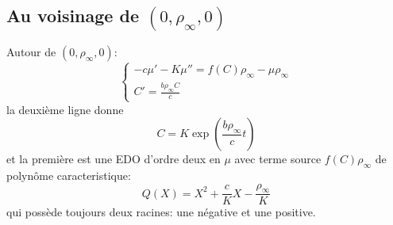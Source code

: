 \subsection{Au voisinage de $(0,\rho_\infty,0)$} 
Autour de $(0,\rho_\infty,0)$:
\begin{equation} \left\{ \begin{array}{ll} -c \mu'-K\mu''=f(C)\rho_\infty-\mu\rho_\infty\\C'=\frac{b\rho_\infty C}{c} \end{array}\right.
\end{equation}
la deuxième ligne donne \begin{equation}
C = K\exp(\frac{b\rho_\infty}{c}t )
\end{equation}
et la première est une EDO d'ordre deux  en $\mu$ avec terme source $f(C)\rho_\infty$ de polynôme caracteristique: \begin{equation}
	Q(X)=X^2+\frac{c}{K}X-\frac{\rho_\infty}{K}
\end{equation} 
qui possède toujours deux racines: une négative et une positive. 
